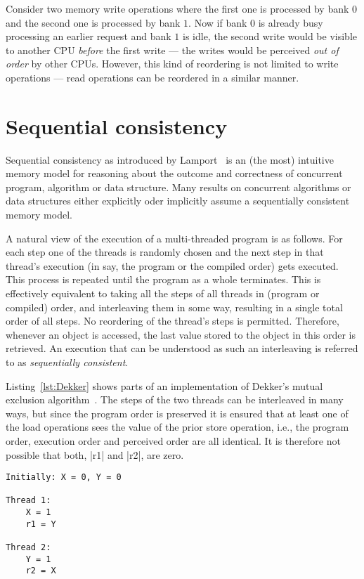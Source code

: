 \documentclass[a4paper,12pt,notitlepage,twoside,openright]{article}
\begin{document}
Consider two memory write operations where the first one is processed
by bank $0$ and the second one is processed by bank $1$. Now if bank
$0$ is already busy processing an earlier request and bank $1$ is
idle, the second write would be visible to another CPU \emph{before}
the first write --- the writes would be perceived \emph{out of order}
by other CPUs. However, this kind of reordering is not limited to
write operations --- read operations can be reordered in a similar
manner.

\section{Sequential consistency}
\label{SequentialConsistency}
Sequential consistency as introduced by Lamport~\cite{Lamport79:sc} is
an (the most) intuitive memory model for reasoning about the outcome
and correctness of concurrent program, algorithm or data
structure. Many results on concurrent algorithms or data structures
either explicitly oder implicitly assume a sequentially consistent
memory model.

A natural view of the execution of a multi-threaded program is as
follows. For each step one of the threads is randomly chosen and the
next step in that thread's execution (in say, the program or the
compiled order) gets executed. This process is repeated until the
program as a whole terminates. This is effectively equivalent to
taking all the steps of all threads in (program or compiled) order,
and interleaving them in some way, resulting in a single total order
of all steps. No reordering of the thread's steps is permitted.
Therefore, whenever an object is accessed, the last value stored to
the object in this order is retrieved. An execution that can be
understood as such an interleaving is referred to as
\emph{sequentially consistent}.

Listing~\ref{lst:Dekker} shows parts of an implementation of Dekker's
mutual exclusion algorithm~\cite{Dijkstra:1965:CSP:1102034}. The steps
of the two threads can be interleaved in many ways, but since the
program order is preserved it is ensured that at least one of the load
operations sees the value of the prior store operation, i.e., the
program order, execution order and perceived order are all
identical. It is therefore not possible that both, |r1| and
|r2|, are zero.

\begin{lstlisting}[caption={Dekker's mutual exclusion algorithm}, label=lst:Dekker]
Initially: X = 0, Y = 0

Thread 1:
	X = 1
	r1 = Y

Thread 2:
	Y = 1
	r2 = X
\end{lstlisting}
\end{document}
